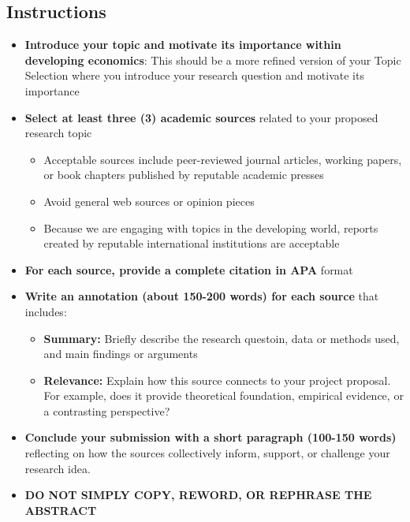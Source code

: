 \documentclass[11pt]{article}
\begin{document}
\subsection*{Instructions}
\begin{itemize}
    \item[\faCheckSquareO] \textbf{Introduce your topic and motivate its importance within developing economics}: This should be a more refined version of your Topic Selection where you introduce your research question and motivate its importance
    \item[\faCheckSquareO] \textbf{Select at least three (3) academic sources} related to your proposed research topic
    \begin{itemize}
        \item[\faFolderOpenO] Acceptable sources include peer-reviewed journal articles, working papers, or book chapters published by reputable academic presses
        \item[\faFolderOpenO] Avoid general web sources or opinion pieces
        \item[\faFolderOpenO] Because we are engaging with topics in the developing world, reports created by reputable international institutions are acceptable 
    \end{itemize}
    \item[\faCheckSquareO] \textbf{For each source, provide a complete citation in APA} format
    \item[\faCheckSquareO] \textbf{Write an annotation (about 150-200 words) for each source} that includes:
    \begin{itemize}
        \item[\faFolderOpenO] \textbf{Summary:} Briefly describe the research questoin, data or methods used, and main findings or arguments
        \item[\faFolderOpenO] \textbf{Relevance:} Explain how this source connects to your project proposal. For example, does it provide theoretical foundation, empirical evidence, or a contrasting perspective?
    \end{itemize}
    \item[\faCheckSquareO] \textbf{Conclude your submission with a short paragraph (100-150 words)} reflecting on how the sources collectively inform, support, or challenge your research idea. 
    \item[{\color{red}\faExclamationTriangle}] \textbf{DO NOT SIMPLY COPY, REWORD, OR REPHRASE THE ABSTRACT}
\end{itemize}
\end{document}
